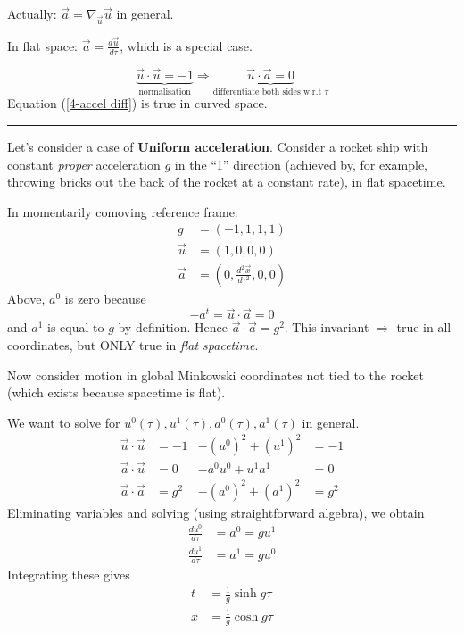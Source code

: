 \documentclass[a4paper]{article} %
\begin{document}
Actually: $\vec{a}=\nabla_{\vec{u}}\vec{u}$ in general.

In flat space: $\vec{a}=\frac{d\vec{u}}{d\tau}$, which is a special case.

\begin{equation}
\underbrace{\vec{u}\cdot\vec{u}=-1}_{\text{normalisation}}\Rightarrow \underbrace{\vec{u}\cdot\vec{a}=0}_{\text{differentiate both sides w.r.t $\tau$}}\label{4-accel diff}
\end{equation}
Equation (\ref{4-accel diff}) is true in curved space.

\hrule

Let's consider a case of \textbf{Uniform acceleration}. Consider a rocket ship with constant \emph{proper} acceleration $g$ in the ``1'' direction (achieved by, for example, throwing bricks out the back of the rocket at a constant rate), in flat spacetime.

In momentarily comoving reference frame:
\begin{align*}
g&=(-1,1,1,1)\\
\vec{u}&=(1,0,0,0)\\
\vec{a}&=(0,\frac{d^2\vec{x}}{d\tau^2},0,0)
\end{align*}
Above, $a^0$ is zero because
\begin{equation}
-a^t=\vec{u}\cdot\vec{a}=0
\end{equation}
and $a^1$ is equal to $g$ by definition. Hence $\vec{a}\cdot\vec{a}=g^2$. This invariant $\Rightarrow$ true in all coordinates, but ONLY true in \emph{flat spacetime}.

Now consider motion in global Minkowski coordinates not tied to the rocket (which exists because spacetime is flat).

We want to solve for $u^0(\tau),u^1(\tau),a^0(\tau),a^1(\tau)$ in general.
\begin{align*}
\vec{u}\cdot\vec{u}&=-1&-(u^0)^2+(u^1)^2&=-1\\
\vec{a}\cdot\vec{u}&=0& -a^0 u^0+u^1 a^1&=0 \\
\vec{a}\cdot\vec{a}&=g^2& -(a^0)^2+(a^1)^2&=g^2
\end{align*}
Eliminating variables and solving (using straightforward algebra), we obtain 
\begin{align}
\frac{du^0}{d\tau}&=a^0=gu^1\\
\frac{du^1}{d\tau}&=a^1=gu^0
\end{align}
Integrating these gives
\begin{align}
t&=\frac{1}{g}\sinh g\tau\\
x&=\frac{1}{g}\cosh g\tau
\end{align}
\end{document}
